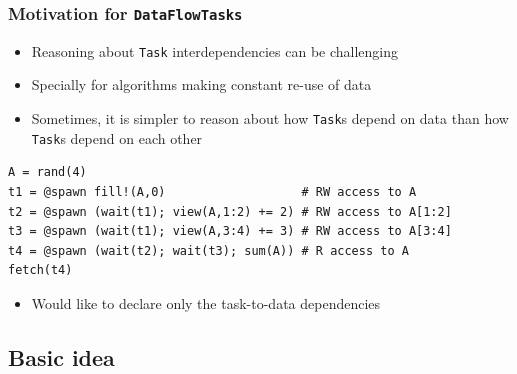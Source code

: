 \documentclass{beamer}
\begin{document}
\begin{frame}[fragile]
\frametitle{Motivation for \texttt{DataFlowTasks}}

\begin{itemize}
    \item Reasoning about \texttt{Task} interdependencies can be
    challenging
    \item Specially for algorithms making constant re-use of data   
    \item Sometimes, it is simpler to reason about how \texttt{Task}s depend on data than how \texttt{Task}s depend on each other
\end{itemize}

\begin{example}
\begin{verbatim}    
A = rand(4)
t1 = @spawn fill!(A,0)                   # RW access to A
t2 = @spawn (wait(t1); view(A,1:2) += 2) # RW access to A[1:2]   
t3 = @spawn (wait(t1); view(A,3:4) += 3) # RW access to A[3:4]
t4 = @spawn (wait(t2); wait(t3); sum(A)) # R access to A
fetch(t4)
\end{verbatim}
\end{example}

\begin{itemize}
  \item<2-> \alert{Would like to declare only the task-to-data dependencies}
\end{itemize}

\end{frame}

\subsection{Basic idea}
\end{document}
